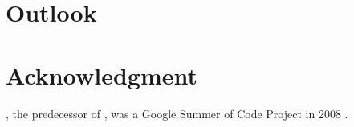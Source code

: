 \section{Outlook\label{outlook}}




\section*{Acknowledgment}

, the predecessor of , was a Google Summer
of Code Project in 2008 \citep{roxygen}.












